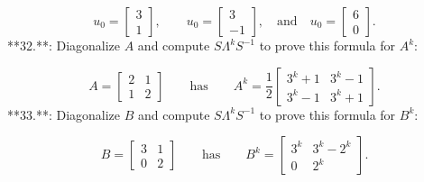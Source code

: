 \[u_{0}=\begin{bmatrix}3\\ 1\end{bmatrix},\qquad u_{0}=\begin{bmatrix}3\\ -1\end{bmatrix},\quad\text{and}\quad u_{0}=\begin{bmatrix}6\\ 0\end{bmatrix}.\]
**32.**: Diagonalize \(A\) and compute \(S\Lambda^{k}S^{-1}\) to prove this formula for \(A^{k}\):

\[A=\begin{bmatrix}2&1\\ 1&2\end{bmatrix}\qquad\text{has}\qquad A^{k}=\frac{1}{2}\begin{bmatrix}3^{k} +1&3^{k}-1\\ 3^{k}-1&3^{k}+1\end{bmatrix}.\]
**33.**: Diagonalize \(B\) and compute \(S\Lambda^{k}S^{-1}\) to prove this formula for \(B^{k}\):

\[B=\begin{bmatrix}3&1\\ 0&2\end{bmatrix}\qquad\text{has}\qquad B^{k}=\begin{bmatrix}3^{k}&3^{k}-2^{k} \\ 0&2^{k}\end{bmatrix}.\]